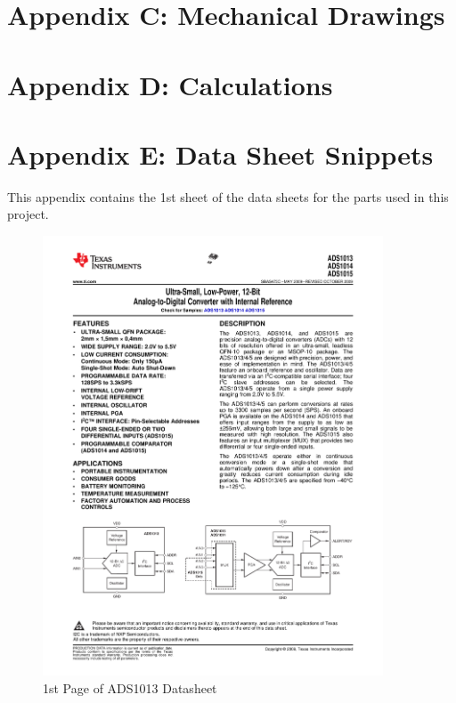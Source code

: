 \documentclass{article}
\begin{document}
{\begin{figure}[H]
	\caption{}
	\label{fig:bom2}
\end{figure}


\newpage
\section{Appendix C: Mechanical Drawings}

\newpage
\section{Appendix D: Calculations}

\newpage
\section{Appendix E: Data Sheet Snippets}
This appendix contains the 1st sheet of the data sheets for the parts used in this project.
\begin{figure}[H]
	\centering
	\includegraphics[page=1,width=0.9\textwidth]{combined.pdf}
	\caption{1st Page of ADS1013 Datasheet}
	\label{fig:adsdat}
\end{figure}
\newpage
\begin{figure}[H]

\end{figure}}
\end{document}
